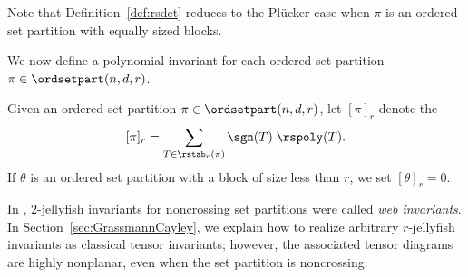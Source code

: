 Note that Definition~\ref{def:rsdet} reduces to the Pl\"ucker case when $\pi$ is an ordered set partition with equally sized blocks.

We now define a polynomial invariant for each ordered set partition $\pi\in\ordsetpart(n,d,r)$. 

\begin{definition}
\label{def:polynomial}
Given an ordered set partition $\pi\in\ordsetpart(n,d,r)$, let $[\pi]_r$ denote the  \[
[\pi]_r = \sum_{T\in \rstab_r(\pi)}\sgn(T) \; \rspoly(T).
\]
If $\theta$ is an ordered set partition with a block of size less than $r$, we set $[\theta]_r=0$.
\end{definition}

\begin{remark}
In \cite{Patrias.Pechenik.Striker}, $2$-jellyfish invariants for noncrossing set partitions were called \emph{web invariants}. In Section~\ref{sec:GrassmannCayley}, we explain how to realize arbitrary $r$-jellyfish invariants as classical tensor invariants; however, the associated tensor diagrams are highly nonplanar, even when the set partition is noncrossing.
\end{remark}

